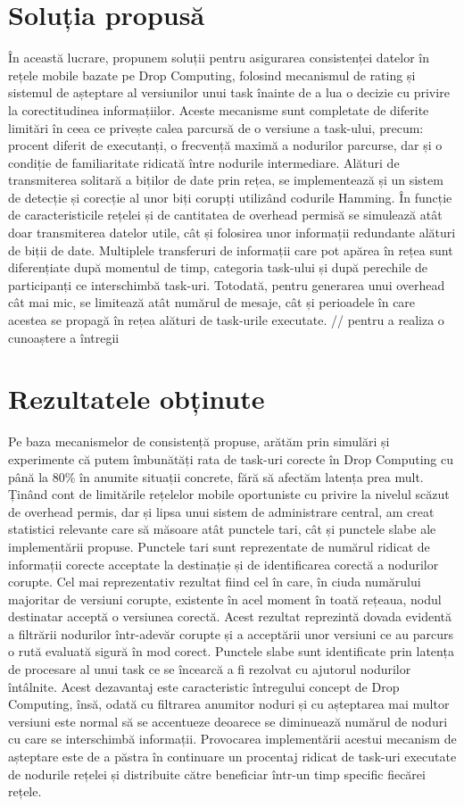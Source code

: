 \documentclass[12pt,a4paper]{report}
\begin{document}
\section{Soluția propusă} 
În această lucrare, propunem soluții pentru asigurarea consistenței datelor în rețele mobile bazate pe Drop Computing, folosind mecanismul de rating și sistemul de așteptare al versiunilor unui task înainte de a lua o decizie cu privire la corectitudinea informațiilor. Aceste mecanisme sunt completate de diferite limitări în ceea ce privește calea parcursă de o versiune a task-ului, precum: procent diferit de executanți, o frecvență maximă a nodurilor parcurse, dar și o condiție de familiaritate ridicată între nodurile intermediare. Alături de transmiterea solitară a biților de date prin rețea, se implementează și un sistem de detecție și corecție al unor biți corupți utilizând codurile Hamming. În funcție de caracteristicile rețelei și de cantitatea de overhead permisă se simulează atât doar transmiterea datelor utile, cât și folosirea unor informații redundante alături de biții de date. Multiplele transferuri de informații care pot apărea în rețea sunt diferențiate după momentul de timp, categoria task-ului și după perechile de participanți ce interschimbă task-uri. Totodată, pentru generarea unui overhead cât mai mic, se limitează atât numărul de mesaje, cât și perioadele în care acestea se propagă în rețea alături de task-urile executate. // pentru a realiza o cunoaștere a întregii 
\section{Rezultatele obținute}
Pe baza mecanismelor de consistență propuse, arătăm prin simulări și experimente că putem îmbunătăți rata de task-uri corecte în Drop Computing cu până la 80\% în anumite situații concrete, fără să afectăm latența prea mult. Ținând cont de limitările rețelelor mobile oportuniste cu privire la nivelul scăzut de overhead permis, dar și lipsa unui sistem de administrare central, am creat statistici relevante care să măsoare atât punctele tari, cât și punctele slabe ale implementării propuse. Punctele tari sunt reprezentate de numărul ridicat de informații corecte acceptate la destinație și de identificarea corectă a nodurilor corupte. Cel mai reprezentativ rezultat fiind cel în care, în ciuda numărului majoritar de versiuni corupte, existente în acel moment în toată rețeaua, nodul destinatar acceptă o versiunea corectă. Acest rezultat reprezintă dovada evidentă a filtrării nodurilor într-adevăr corupte și a acceptării unor versiuni ce au parcurs o rută evaluată sigură în mod corect. Punctele slabe sunt identificate prin latența de procesare al unui task ce se încearcă a fi rezolvat cu ajutorul nodurilor întâlnite. Acest dezavantaj este caracteristic întregului concept de Drop Computing, însă, odată cu filtrarea anumitor noduri și cu așteptarea mai multor versiuni este normal să se accentueze deoarece se diminuează numărul de noduri cu care se interschimbă informații. Provocarea implementării acestui mecanism de așteptare este de a păstra în continuare un procentaj ridicat de task-uri executate de nodurile rețelei și distribuite către beneficiar într-un timp specific fiecărei rețele. 
\end{document}
